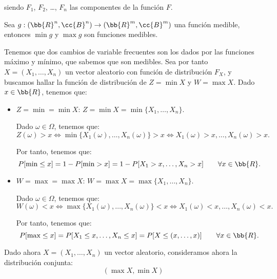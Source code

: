 siendo $F_1$, $F_2$, \ldots, $F_n$ las componentes de la función $F$.

\begin{prop}
    Sea $g:(\bb{R}^n, \cc{B}^n)\to (\bb{R}^m, \cc{B}^m)$ una función medible, entonces $\min g$ y $\max g$ son funciones medibles.
\end{prop}

Tenemos que dos cambios de variable frecuentes son los dados por las funciones máximo y mínimo, que sabemos que son medibles.
Sea por tanto $X=(X_1,\dots,X_n)$ un vector aleatorio con función de distribución $F_X$, y buscamos hallar la función de distribución de $Z=\min X$ y $W=\max X$.
Dado $x\in \bb{R}$, tenemos que:
\begin{itemize}
    \item \ul{$Z=\min = \min X$}: $Z=\min X = \min\{X_1,\dots,X_n\}$.
    
    Dado $\omega\in \Omega$, tenemos que:
    \begin{equation*}
        Z(\omega)>x \Longleftrightarrow \min\{X_1(\omega),\dots,X_n(\omega)\}>x \Longleftrightarrow X_1(\omega)>x,\dots,X_n(\omega)>x.
    \end{equation*}

    Por tanto, tenemos que:
    \begin{equation*}
        P[\min \leq x] = 1-P[\min > x] = 1-P[X_1>x,\dots,X_n>x]\qquad \forall x\in \bb{R}.
    \end{equation*}

    \item \ul{$W=\max = \max X$}: $W=\max X = \max\{X_1,\dots,X_n\}$.
    
    Dado $\omega\in \Omega$, tenemos que:
    \begin{equation*}
        W(\omega)<x \Longleftrightarrow \max\{X_1(\omega),\dots,X_n(\omega)\}<x \Longleftrightarrow X_1(\omega)<x,\dots,X_n(\omega)<x.
    \end{equation*}

    Por tanto, tenemos que:
    \begin{equation*}
        P[\max \leq x] = P[X_1\leq x,\dots,X_n\leq x]=P[X\leq (x,\dots,x)]\qquad \forall x\in \bb{R}.
    \end{equation*}
\end{itemize}

Dado ahora $X=(X_1,\dots,X_n)$ un vector aleatorio, consideramos ahora la distribución conjunta:
\begin{equation*}
    (\max X, \min X)
\end{equation*}

